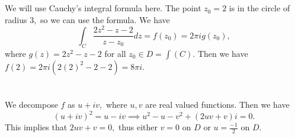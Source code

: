 \documentclass{article}
\title{} %
\author{Gandhar Kulkarni (mmat2304)} %
\date{} %
\begin{document}
\maketitle %


\section{} %
We will use Cauchy's integral formula here. The point $z_0=2$ is in the circle of radius $3,$ so we can use the formula. We have $$\int_C 
\frac{2z^2-z-2}{z-z_0}dz= f(z_0)=2 \pi i g(z_0),$$ where $g(z)=2z^2-z-2$ for all $z_0 \in D= \int(C).$ Then we have $f(2)=2 \pi i (2(2)^2-2-2)=8\pi i.$    
\section{} %
\section{} %
\section{} %
\section{} %
We decompose $f$ as $u+iv,$ where $u,v$ are real valued functions. Then we have $$(u+iv)^2=u-iv \implies u^2-u-v^2 + (2uv+v)i =0.$$
This implies that $2uv+v=0,$ thus either $v=0$ on $D$ or $u= \frac{-1}{2}$ on $D.$
\section{} %
\section{} %
\section{} %
\end{document}
